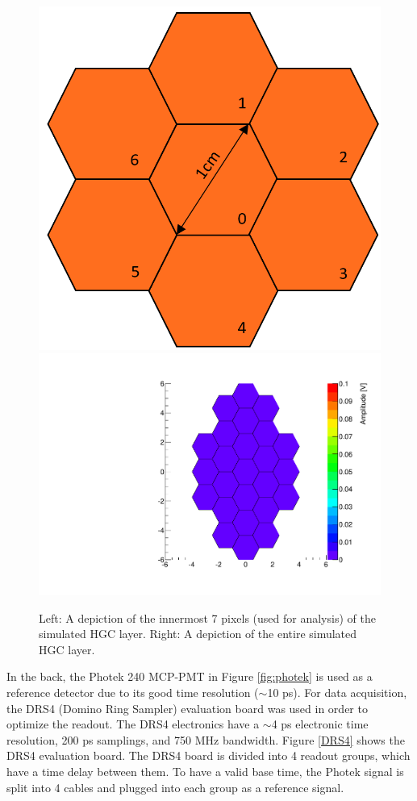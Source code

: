 \documentclass[twocolumn,aps,prd,reprint,superscriptaddress,floatfix]{revtex4-1}
\begin{document}
\begin{figure}[!htbp]
	\centering
	\includegraphics[width=0.57\linewidth]{HGC}
    \includegraphics[width=0.37\linewidth]{javier_HGC_plot_--_not_filled_in} 
	\caption{Left: A depiction of the innermost 7 pixels (used for analysis) of the simulated HGC layer. 
	Right: A depiction of the entire simulated HGC layer.}
	\label{fig:HGC}
\end{figure}

In the back, the Photek 240 MCP-PMT in Figure \ref{fig:photek} is used as a reference detector due to its good time resolution ($\sim$10 ps). 
For data acquisition, the DRS4 (Domino Ring Sampler) evaluation board was used in order to optimize the readout.
The DRS4 electronics have a $\sim$4 ps electronic time resolution, 200 ps samplings, and 750 MHz bandwidth.
Figure \ref{DRS4} shows the DRS4 evaluation board.
The DRS4 board is divided into 4 readout groups, which have a time delay between them.
To have a valid base time, the Photek signal is split into 4 cables and plugged into each group as a reference signal. 
\end{document}
